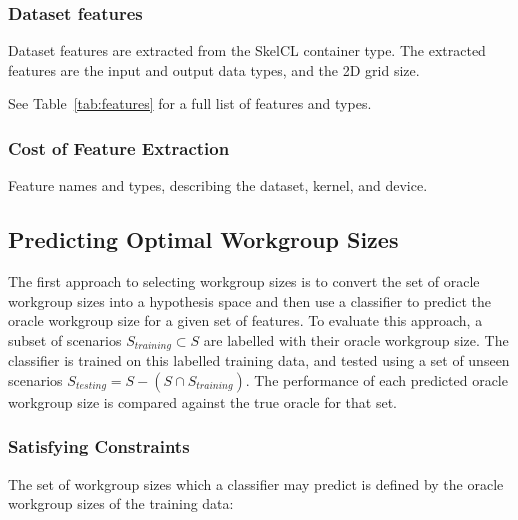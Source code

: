 

\subsubsection{Dataset features}

Dataset features are extracted from the SkelCL container type. The
extracted features are the input and output data types, and the 2D
grid size.

See Table~\ref{tab:features} for a full list of features and
types.

\subsubsection{Cost of Feature Extraction}


\begin{table}

\caption{Feature names and types, describing the dataset, kernel,
  and device.}
\label{tab:features}
\end{table}


\subsection{Predicting Optimal Workgroup Sizes}

The first approach to selecting workgroup sizes is to convert the set
of oracle workgroup sizes into a hypothesis space and then use a
classifier to predict the oracle workgroup size for a given set of
features. To evaluate this approach, a subset of scenarios
$S_{training} \subset S$ are labelled with their oracle workgroup
size. The classifier is trained on this labelled training data, and
tested using a set of unseen scenarios
$S_{testing} = S - (S \cap S_{training})$. The performance of each
predicted oracle workgroup size is compared against the true oracle
for that set.


\subsubsection{Satisfying Constraints}

The set of workgroup sizes which a classifier may predict is defined
by the oracle workgroup sizes of the training data:

